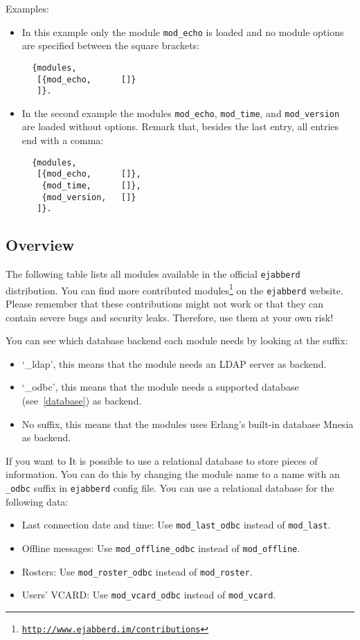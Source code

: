 \documentclass[a4paper,10pt]{book}
\newcommand{\ind}[1]{\begin{latexonly}\index{#1}\end{latexonly}}
\newcommand{\term}[1]{\texttt{#1}}
\newcommand{\ejabberd}{\texttt{ejabberd}}
\newcommand{\module}[1]{\texttt{#1}}
\newcommand{\modecho}{\module{mod\_echo}}
\newcommand{\modtime}{\module{mod\_time}}
\newcommand{\modversion}{\module{mod\_version}}
\gdef\footahref#1#2{#2\footnote{\href{#1}{\texttt{#1}}}}
\begin{document}
Examples:
\begin{itemize}
\item In this example only the module \modecho{} is loaded and no module
  options are specified between the square brackets:
  \begin{verbatim}
  {modules,
   [{mod_echo,      []}
   ]}.
\end{verbatim}
\item In the second example the modules \modecho{}, \modtime{}, and
  \modversion{} are loaded without options. Remark that, besides the last entry,
  all entries end with a comma:
  \begin{verbatim}
  {modules,
   [{mod_echo,      []},
    {mod_time,      []},
    {mod_version,   []}
   ]}.
\end{verbatim}
\end{itemize}

\subsection{Overview}
\label{modoverview}
\ind{modules!overview}\ind{XMPP compliancy}

The following table lists all modules available in the official \ejabberd{}
distribution. You can find more
\footahref{http://www.ejabberd.im/contributions}{contributed modules} on the
\ejabberd{} website. Please remember that these contributions might not work or
that they can contain severe bugs and security leaks. Therefore, use them at
your own risk!

You can see which database backend each module needs by looking at the suffix:
\begin{itemize}
\item `\_ldap', this means that the module needs an LDAP server as backend.
\item `\_odbc', this means that the module needs a supported database
  (see~\ref{database}) as backend.
\item No suffix, this means that the modules uses Erlang's built-in database
  Mnesia as backend.
\end{itemize}

If you want to
It is possible to use a relational database to store pieces of
information. You can do this by changing the module name to a name with an
\term{\_odbc} suffix in \ejabberd{} config file. You can use a relational
database for the following data:

\begin{itemize}
\item Last connection date and time: Use \term{mod\_last\_odbc} instead of
  \term{mod\_last}.
\item Offline messages: Use \term{mod\_offline\_odbc} instead of
  \term{mod\_offline}.
\item Rosters: Use \term{mod\_roster\_odbc} instead of \term{mod\_roster}.
\item Users' VCARD: Use \term{mod\_vcard\_odbc} instead of \term{mod\_vcard}.
\end{itemize}
\end{document}
